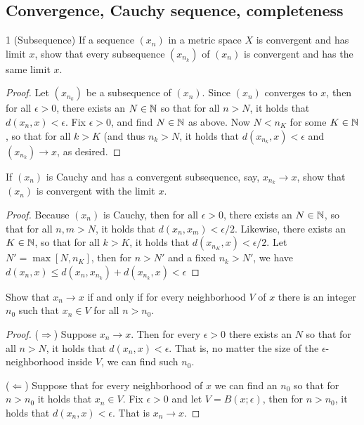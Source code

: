 \subsection{Convergence, Cauchy sequence, completeness}

\begin{exercise}{1 (Subsequence)}
If a sequence $(x_n)$ in a metric space $X$ is convergent and has limit $x$, show that every subsequence $(x_{n_k})$ of $(x_n)$ is convergent and has the same limit $x$.
\end{exercise}
\begin{proof}
Let $(x_{n_k})$ be a subsequence of $(x_n)$. Since $(x_n)$ converges to $x$, then for all $\epsilon>0$, there exists an $N\in\mathbb{N}$ so that for all $n>N$, it holds that $d(x_n,x)<\epsilon$. Fix $\epsilon>0$, and find $N\in\mathbb{N}$ as above. Now $N<n_K$ for some $K\in\mathbb{N}$, so that for all $k>K$ (and thus $n_k>N$, it holds that $d(x_{n_k},x)<\epsilon$ and $(x_{n_k})\to x$, as desired.
\end{proof}

\begin{exercise}{2}
If $(x_n)$ is Cauchy and has a convergent subsequence, say, $x_{n_k}\to x$, show that $(x_n)$ is convergent with the limit $x$.
\end{exercise}
\begin{proof}
Because $(x_n)$ is Cauchy, then for all $\epsilon>0$, there exists an $N\in\mathbb{N}$, so that for all $n,m>N$, it holds that $d(x_n,x_m)<\epsilon/2$. Likewise, there exists an $K\in\mathbb{N}$, so that for all $k>K$, it holds that $d(x_{n_K},x)<\epsilon/2$. Let $N'=\max[N,n_K]$, then for $n>N'$ and a fixed $n_k>N'$, we have $d(x_n,x)\leq d(x_n,x_{n_k})+d(x_{n_k},x)<\epsilon$
\end{proof}

\begin{exercise}{3}
Show that $x_n\to x$ if and only if for every neighborhood $V$ of $x$ there is an integer $n_0$ such that $x_n\in V$ for all $n>n_0$.
\end{exercise}
\begin{proof}
($\Rightarrow$) Suppose $x_n\to x$. Then for every $\epsilon>0$ there exists an $N$ so that for all $n>N$, it holds that $d(x_n,x)<\epsilon$. That is, no matter the size of the $\epsilon$-neighborhood inside $V$, we can find such $n_0$.

($\Leftarrow$) Suppose that for every neighborhood of $x$ we can find an $n_0$ so that for $n>n_0$ it holds that $x_n\in V$. Fix $\epsilon>0$ and let $V=B(x;\epsilon)$, then for $n>n_0$, it holds that $d(x_n,x)<\epsilon$. That is $x_n\to x$.
\end{proof}

